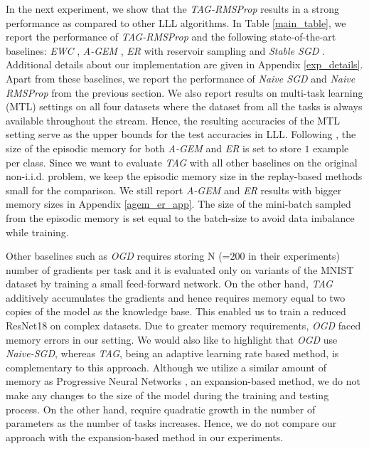 \documentclass{article} \usepackage{collas2022_conference,times}
\begin{document}
{ In the next experiment, we show that the \textit{TAG-RMSProp} results in a strong performance as compared to other LLL algorithms. In Table \ref{main_table}, we report the performance of \textit{TAG-RMSProp} and the following state-of-the-art baselines: \textit{EWC} \citep{kirkpatrick2017overcoming}, \textit{A-GEM} \citep{chaudhry2018efficient}, \textit{ER} \citep{aljundi2019online} with reservoir sampling and \textit{Stable SGD} \citep{mirzadeh2020understanding}. Additional details about our implementation are given in Appendix \ref{exp_details}.}
Apart from these baselines, we report the performance of \textit{Naive SGD} and \textit{Naive RMSProp} from the previous section. We also report results on multi-task learning (MTL) settings on all four datasets where the dataset from all the tasks is always available throughout the stream. Hence, the resulting accuracies of the MTL setting serve as the upper bounds for the test accuracies in LLL. Following \citet{mirzadeh2020understanding}, the size of the episodic memory for both \textit{A-GEM} and \textit{ER} is set to store $1$ example per class. Since we want to evaluate \textit{TAG} with all other baselines on the original non-i.i.d. problem, we keep the episodic memory size in the replay-based methods small for the comparison. We still report \textit{A-GEM} and \textit{ER} results with bigger memory sizes in Appendix \ref{agem_er_app}. The size of the mini-batch sampled from the episodic memory is set equal to the batch-size to avoid data imbalance while training. 

Other baselines such as \textit{OGD} \citep{farajtabar2020orthogonal} requires storing N (=$200$ in their experiments) number of gradients per task and it is evaluated only on variants of the MNIST dataset by training a small feed-forward network. On the other hand, \textit{TAG} additively accumulates the gradients and hence requires memory equal to two copies of the model as the knowledge base. This enabled us to train a reduced ResNet18 on complex datasets. Due to greater memory requirements, \textit{OGD} faced memory errors in our setting. We would also like to highlight that \textit{OGD} use \textit{Naive-SGD}, whereas \textit{TAG}, being an adaptive learning rate based method, is complementary to this approach.{ Although we utilize a similar amount of memory as Progressive Neural Networks \cite{rusu2016progressive}, an expansion-based method, we do not make any changes to the size of the model during the training and testing process. On the other hand, \cite{rusu2016progressive} require quadratic growth in the number of parameters as the number of tasks increases. Hence, we do not compare our approach with the expansion-based method in our experiments.}
    
\end{document}
